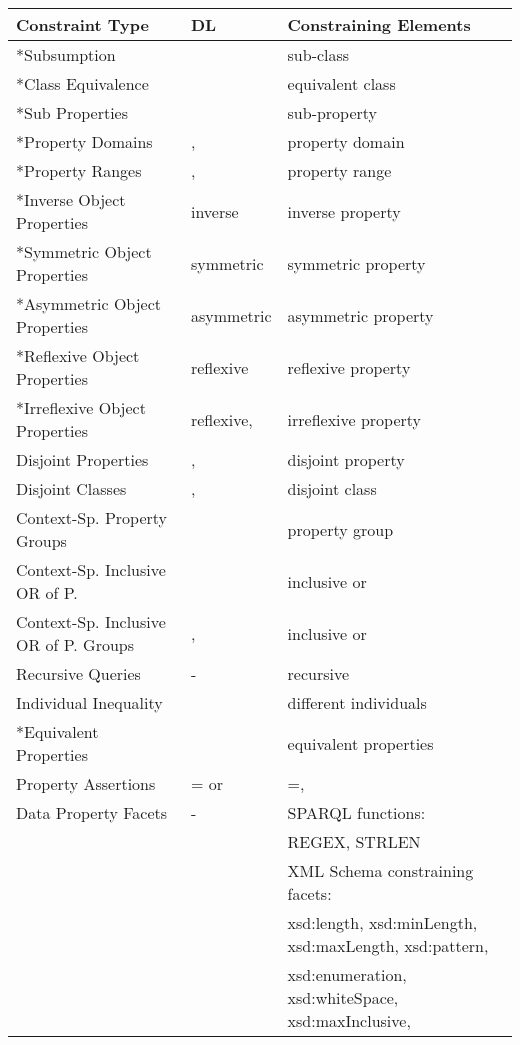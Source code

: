 \documentclass{llncs}
\begin{document}
\begin{table}[H]
    \begin{center}
    \begin{tabular}{lll}
           \multicolumn{1}{l}{\textbf{Constraint Type}} & \multicolumn{1}{l}{\textbf{DL}} & \multicolumn{1}{l}{\textbf{Constraining Elements}}			 
    \\ \midrule
		
*Subsumption &  & sub-class \\
*Class Equivalence &  & equivalent class \\
*Sub Properties &  & sub-property \\
*Property Domains & ,  & property domain \\
*Property Ranges & ,  & property range \\
*Inverse Object Properties & inverse & inverse property \\
*Symmetric Object Properties & symmetric & symmetric property \\
*Asymmetric Object Properties & asymmetric & asymmetric property \\
*Reflexive Object Properties & reflexive & reflexive property \\
*Irreflexive Object Properties & reflexive,  & irreflexive property \\
Disjoint Properties & ,  & disjoint property \\
Disjoint Classes & ,  & disjoint class \\
Context-Sp. Property Groups &  & property group \\
Context-Sp. Inclusive OR of P. &  & inclusive or \\
Context-Sp. Inclusive OR of P. Groups & ,  & inclusive or \\
Recursive Queries & - & recursive \\
Individual Inequality &  & different individuals \\
*Equivalent Properties &  & equivalent properties \\
Property Assertions & = or  & =,  \\
Data Property Facets & - & SPARQL functions: \\
                        && REGEX, STRLEN \\
												&& XML Schema constraining facets: \\
                        && xsd:length, xsd:minLength, xsd:maxLength, xsd:pattern, \\
												&& xsd:enumeration, xsd:whiteSpace, xsd:maxInclusive, \\

\end{tabular}
\end{center}
\end{table}
\end{document}
